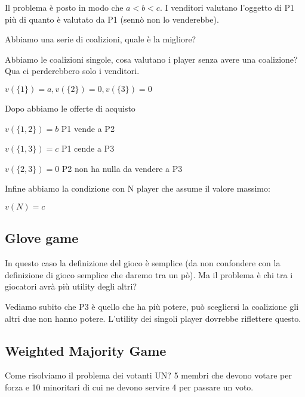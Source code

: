 \documentclass[10pt,a4paper]{report}
\begin{document}
        Il problema è posto in modo che $a < b < c$. I venditori valutano l'oggetto di P1 più di quanto è valutato da P1 (sennò non lo venderebbe).

        Abbiamo una serie di coalizioni, quale è la migliore?

        Abbiamo le coalizioni singole, cosa valutano i player senza avere una coalizione? Qua ci perderebbero solo i venditori.

        \begin{center}
            $v(\{1\}) = a, v(\{2\}) = 0, v(\{3\}) = 0$
        \end{center}

        Dopo abbiamo le offerte di acquisto

        \begin{center}
            $v(\{1,2\}) = b$ P1 vende a P2

            $v(\{1, 3\}) = c$ P1 cende a P3

            $v(\{2,3\}) = 0$ P2 non ha nulla da vendere a P3
        \end{center}

        Infine abbiamo la condizione con N player che assume il valore massimo:

        \begin{center}
            $v(N) = c$
        \end{center}

        \subsection{Glove game}

        In questo caso la definizione del gioco è semplice (da non confondere con la definizione di gioco semplice che daremo tra un pò). Ma il problema è chi tra i giocatori avrà più utility degli altri?

        Vediamo subito che P3 è quello che ha più potere, può scegliersi la coalizione gli altri due non hanno potere. L'utility dei singoli player dovrebbe riflettere questo.

        \subsection{Weighted Majority Game}

        Come risolviamo il problema dei votanti UN? 5 membri che devono votare per forza e 10 minoritari di cui ne devono servire 4 per passare un voto.
\end{document}
